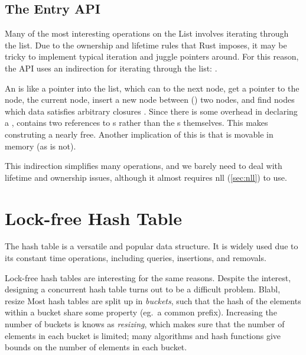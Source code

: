 \subsection{The Entry API}

Many of the most interesting operations on the List involves iterating through the list. Due to the
ownership and lifetime rules that Rust imposes, it may be tricky to implement typical iteration
and juggle pointers around. For this reason, the API uses an indirection for iterating through the
list: .

\begin{figure}[ht]

\end{figure}

An  is like a pointer into the list, which can  to the next node, get a
pointer to the  node,  the current node, insert a new node between
() two nodes, and find nodes which data satisfies arbitrary closures
.  Since there is some overhead in declaring a , 
contains two references to s rather than the s themselves. This makes
construting a  nearly free.  Another implication of this is that  is
movable in memory (as  is not).

This indirection simplifies many operations, and we barely need to deal with lifetime and ownership
issues, although it almost requires \gls{nll} (\cref{sec:nll}) to use.

\begin{figure}[ht]

\end{figure}







\section{Lock-free Hash Table}

The hash table is a versatile and popular data structure. It is widely used due to its constant time
operations, including queries, insertions, and removals.

Lock-free hash tables are interesting for the same reasons. Despite the interest, designing a
concurrent hash table turns out to be a difficult problem. Blabl, resize
Most hash tables are split up in \emph{buckets}, such that the hash of the elements within a bucket
share some property (eg.\ a common prefix). Increasing the number of buckets is knows as
\emph{resizing}, which makes sure that the number of elements in each bucket is limited; many
algorithms and hash functions give bounds on the number of elements in each bucket.

